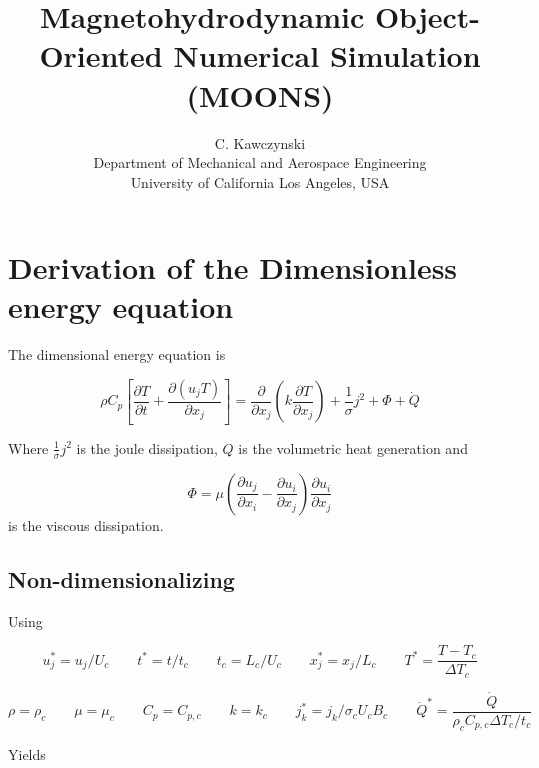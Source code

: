 \documentclass[11pt]{article}
\begin{document}
\doublespacing
\title{Magnetohydrodynamic Object-Oriented Numerical Simulation (MOONS)}
\author{C. Kawczynski \\
Department of Mechanical and Aerospace Engineering \\
University of California Los Angeles, USA\\
}
\maketitle

\section{Derivation of the Dimensionless energy equation}
The dimensional energy equation is

\begin{equation}
	\rho C_p
	\left[
	\frac{\partial T}{\partial t} +
	\frac{\partial (u_j T)}{\partial x_j}
	\right]
	= 
	\frac{\partial}{\partial x_j}
	\left( 
	k \frac{\partial T}{\partial x_j}
	\right) + 
	\frac{1}{\sigma} j^2 +
	\Phi +
	\dot{Q}
\end{equation}

Where $\frac{1}{\sigma} j^2$ is the joule dissipation, $Q$ is the volumetric heat generation and

\begin{equation}
	\Phi
	=
	\mu
	\left(
	\frac{\partial u_j}{\partial x_i}
	-
	\frac{\partial u_i}{\partial x_j}
	\right)
	\frac{\partial u_i}{\partial x_j}
\end{equation}
is the viscous dissipation.

\subsection{Non-dimensionalizing}

Using

\begin{equation}
	u_j^* = u_j/U_c \qquad
	t^* = t/t_c \qquad
	t_c = L_c/U_c \qquad
	x_j^* = x_j/L_c \qquad
	T^* = \frac{T - T_c}{\Delta T_c}
\end{equation}

\begin{equation}
	\rho = \rho_c \qquad
	\mu = \mu_c \qquad
	C_p = C_{p,c} \qquad
	k = k_c \qquad
	j_k^* = j_k/ \sigma_c U_c B_c \qquad
	\dot{Q}^* = \frac{\dot{Q}}{\rho_c C_{p,c} \Delta T_c / t_c}
\end{equation}

Yields
\end{document}
